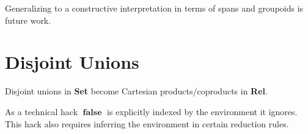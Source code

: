 \documentclass{scrartcl}
\newcommand{\Rel}{\textbf{Rel}}
\newcommand{\Set}{\textbf{Set}}
\DeclareMathOperator{\false}{\textbf{false}}
\begin{document}
Generalizing to a constructive interpretation in terms of spans and
groupoids is future work.

\section*{Disjoint Unions}

Disjoint unions in \Set{} become Cartesian products/coproducts in
\Rel{}.


As a technical hack \(\false\) is explicitly indexed by the environment it ignores.
This hack also requires inferring the environment in certain reduction rules.
\end{document}
